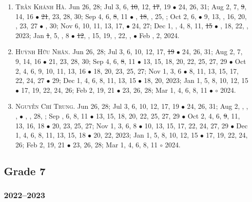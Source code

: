 \documentclass{article}
\begin{document}
\begin{enumerate}
	\item \textsc{Trần Khánh Hà.} {\sf[In]} Jun 26, 28; Jul 3, 6, \st{10}, 12, \st{17}, 19 $\bullet$ 24, 26, 31; Aug 2, 7, \st{9}, 14, 16 $\bullet$ \st{21}, 23, 28, 30; Sep 4, 6, \st{8}, 11 $\bullet$ , \st{18}, , 25, ; Oct 2, 6,   $\bullet$ 9, 13, , 16, 20, , 23, 27 $\bullet$ , 30; Nov 6, 10, 11, 13, 17,  $\bullet$ 24, 27; Dec 1, , 4, 8, 11, \st{15} $\bullet$ , 18, 22, , 2023; Jan \st{1}, 5, , 8  $\bullet$ \st{12}, , 15, 19, , 22, ,  $\bullet$ Feb , 2, 2024.
	\item \textsc{Huỳnh Hữu Nhân.} {\sf[In]} Jun 26, 28; Jul 3, 6, 10, 12, 17, \st{19} $\bullet$ 24, 26, 31; Aug 2, 7, 9, 14, 16 $\bullet$ 21, 23, 28, 30; Sep 4, 6, \st{8}, 11 $\bullet$ 13, 15, 18, 20, 22, 25, 27, 29 $\bullet$ Oct 2, 4, 6, 9, 10, 11, 13, 16 $\bullet$ 18, 20, 23, 25, 27; Nov 1, 3, 6 $\bullet$ 8, 11, 13, 15, 17, 22, 24, 27 $\bullet$ 29; Dec 1, 4, 6, 8, 11, 13, 15 $\bullet$ 18, 20, 2023; Jan 1, 5, 8, 10, 12, 15 $\bullet$ 17, 19, 22, 24, 26; Feb 2, 19, 21 $\bullet$ 23, 26, 28; Mar 1, 4, 6, 8, 11 $\bullet$ $\circ$ 2024.
	\item \textsc{Nguyễn Chí Trung.} {\sf[In]} Jun 26, 28; Jul 3, 6, 10, 12, 17, 19 $\bullet$ 24, 26, 31; Aug 2, , , ,  $\bullet$ , , 28, ; Sep , 6, 8, 11 $\bullet$ 13, 15, 18, 20, 22, 25, 27, 29 $\bullet$ Oct 2, 4, 6, \st{9}, 11, 13, 16, 18 $\bullet$ 20, 23, 25, 27; Nov 1, 3, 6, 8 $\bullet$ 10, 13, 15, 17, 22, 24, 27, 29 $\bullet$ Dec 1, 4, 6, 8, 11, 13, 15, 18 $\bullet$ 20, 22, 2023; Jan 1, 5, 8, 10, 12, 15 $\bullet$ 17, 19, 22, 24, 26; Feb 2, 19, 21 $\bullet$ 23, 26, 28; Mar 1, 4, 6, 8, 11 $\circ$ 2024.
\end{enumerate}

\subsection{Grade 7}

\subsubsection{2022--2023}
\end{document}
